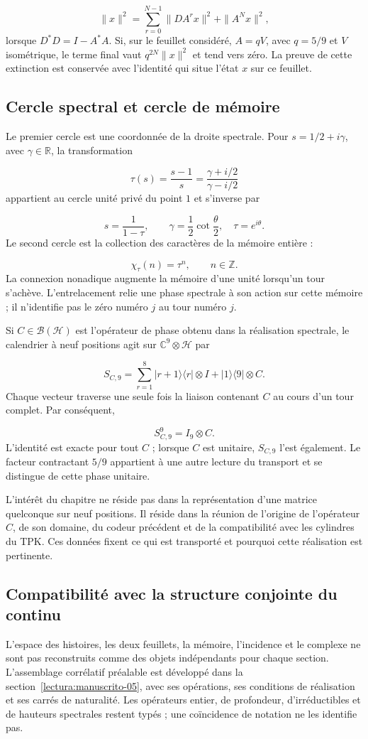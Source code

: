 \[
\|x\|^2=\sum_{r=0}^{N-1}\|DA^rx\|^2+\|A^Nx\|^2,
\]
lorsque $D^*D=I-A^*A$. Si, sur le feuillet considéré, $A=qV$, avec $q=5/9$ et $V$ isométrique, le terme final vaut $q^{2N}\|x\|^2$ et tend vers zéro. La preuve de cette extinction est conservée avec l’identité qui situe l’état $x$ sur ce feuillet.

\subsection{Cercle spectral et cercle de mémoire}
Le premier cercle est une coordonnée de la droite spectrale. Pour $s=1/2+i\gamma$, avec \(\gamma\in\mathbb R\), la transformation

\[
\tau(s)=\frac{s-1}{s}
=\frac{\gamma+i/2}{\gamma-i/2}
\]
appartient au cercle unité privé du point \(1\) et s'inverse par

\[
s=\frac1{1-\tau},\qquad
\gamma=\frac12\cot\frac{\theta}{2},\quad\tau=e^{i\theta}.
\]
Le second cercle est la collection des caractères de la mémoire entière :

\[
\chi_\tau(n)=\tau^n,\qquad n\in\mathbb Z.
\]
La connexion nonadique augmente la mémoire d’une unité lorsqu’un tour s’achève. L’entrelacement relie une phase spectrale à son action sur cette mémoire ; il n’identifie pas le zéro numéro $j$ au tour numéro $j$.

Si \(C\in\mathcal B(\mathcal H)\) est l'opérateur de phase obtenu dans la réalisation spectrale, le calendrier à neuf positions agit sur \(\mathbb C^9\otimes\mathcal H\) par

\[
S_{C,9}=\sum_{r=1}^8|r+1\rangle\langle r|\otimes I
+|1\rangle\langle9|\otimes C.
\]
Chaque vecteur traverse une seule fois la liaison contenant $C$ au cours d'un tour complet. Par conséquent,

\[
S_{C,9}^9=I_9\otimes C.
\]
L'identité est exacte pour tout $C$ ; lorsque $C$ est unitaire, $S_{C,9}$ l'est également. Le facteur contractant $5/9$ appartient à une autre lecture du transport et se distingue de cette phase unitaire.

L'intérêt du chapitre ne réside pas dans la représentation d'une matrice quelconque sur neuf positions. Il réside dans la réunion de l'origine de l'opérateur $C$, de son domaine, du codeur précédent et de la compatibilité avec les cylindres du TPK. Ces données fixent ce qui est transporté et pourquoi cette réalisation est pertinente.

\subsection{Compatibilité avec la structure conjointe du continu}
L’espace des histoires, les deux feuillets, la mémoire, l’incidence et le complexe ne sont pas reconstruits comme des objets indépendants pour chaque section. L’assemblage corrélatif préalable est développé dans la section~\ref{lectura:manuscrito-05}, avec ses opérations, ses conditions de réalisation et ses carrés de naturalité. Les opérateurs entier, de profondeur, d’irréductibles et de hauteurs spectrales restent typés ; une coïncidence de notation ne les identifie pas.

